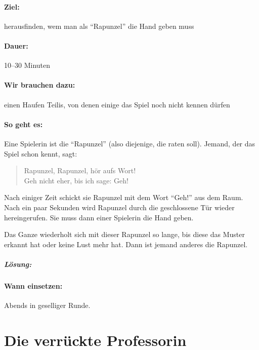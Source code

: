 \paragraph{Ziel:} herausfinden, wem man als "`Rapunzel"' die Hand geben muss
\paragraph{Dauer:} 10--30 Minuten
\paragraph{Wir brauchen dazu:} einen Haufen Teilis, von denen einige das Spiel noch nicht kennen dürfen
\paragraph{So geht es:} Eine Spielerin ist die "`Rapunzel"' (also diejenige, die raten soll). Jemand, der das Spiel schon kennt, sagt:
  \begin{quote}
    Rapunzel, Rapunzel, hör aufs Wort!\\
    Geh nicht eher, bis ich sage: Geh!
  \end{quote}
Nach einiger Zeit schickt sie Rapunzel mit dem Wort "`Geh!"' aus dem Raum. Nach ein paar Sekunden wird Rapunzel durch die geschlossene Tür wieder hereingerufen. Sie muss dann einer Spielerin die Hand geben.

Das Ganze wiederholt sich mit dieser Rapunzel so lange, bis diese das Muster erkannt hat oder keine Lust mehr hat. Dann ist jemand anderes die Rapunzel.

\subparagraph{Lösung:}
\vspace{.5em}

\paragraph{Wann einsetzen:} Abends in geselliger Runde.

\section{Die verrückte Professorin}
